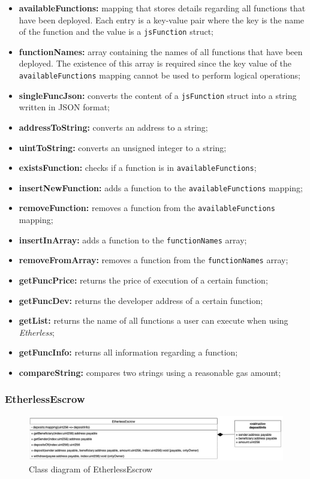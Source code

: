	\begin{itemize}
		\item \textbf{availableFunctions:} mapping that stores details regarding all functions that have been deployed. Each entry is a key-value pair where the key is the name of the function and the value is a \texttt{jsFunction} struct;
		\item \textbf{functionNames:} array containing the names of all functions that have been deployed. The existence of this array is required since the key value of the \texttt{availableFunctions} mapping cannot be used to perform logical operations;
	\end{itemize}
	\begin{itemize}
		\item \textbf{singleFuncJson:} converts the content of a \texttt{jsFunction} struct into a string written in JSON format;
		\item \textbf{addressToString:} converts an address to a string;
		\item \textbf{uintToString:} converts an unsigned integer to a string;
		\item \textbf{existsFunction:} checks if a function is in \texttt{availableFunctions};
		\item \textbf{insertNewFunction:} adds a function to the \texttt{availableFunctions} mapping;
		\item \textbf{removeFunction:} removes a function from the \texttt{availableFunctions} mapping;
		\item \textbf{insertInArray:} adds a function to the \texttt{functionNames} array;
		\item \textbf{removeFromArray:} removes a function from the \texttt{functionNames} array;
		\item \textbf{getFuncPrice:} returns the price of execution of a certain function;
		\item \textbf{getFuncDev:} returns the developer address of a certain function;
		\item \textbf{getList:} returns the name of all functions a user can execute when using \textit{Etherless};
		\item \textbf{getFuncInfo:} returns all information regarding a function;
		\item \textbf{compareString:} compares two strings using a reasonable gas amount;
	\end{itemize}

\subsubsection{EtherlessEscrow}
	\begin{figure}[H]
		\centering
		\includegraphics[width=1\linewidth]{diagrammi/etherless-smart/EtherlessEscrow.jpg}
		\caption{Class diagram of EtherlessEscrow}
	\end{figure}

